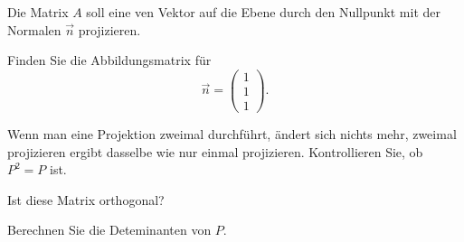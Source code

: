 Die Matrix $A$ soll eine ven Vektor auf die Ebene durch den
Nullpunkt mit der Normalen $\vec n$ projizieren.
\begin{teilaufgaben}
\item
Finden Sie die Abbildungsmatrix für
\[
\vec n=\begin{pmatrix}1\\1\\1\end{pmatrix}.
\]
\item
Wenn man eine Projektion zweimal durchführt, ändert sich nichts mehr,
zweimal projizieren ergibt dasselbe wie nur einmal projizieren.
Kontrollieren Sie, ob $P^2=P$ ist.
\item
Ist diese Matrix orthogonal?
\item
Berechnen Sie die Deteminanten von $P$.
\end{teilaufgaben}

